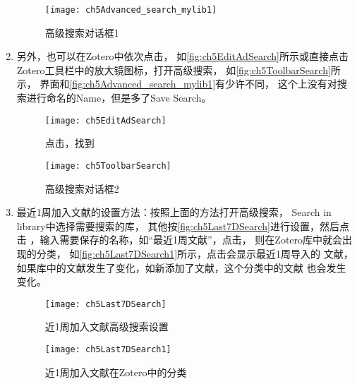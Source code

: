 \documentclass[cn,11pt,chinese]{elegantbook}
\begin{document}
\begin{enumerate}
						\begin{figure}[ht]
							\centering
							\texttt{[image: ch5Advanced\_search\_mylib1]}
							\caption{高级搜索对话框1}
							\label{fig:ch5Advanced_search_mylib1}
						\end{figure}
					\item 另外，也可以在Zotero中依次点击，
					如\autoref{fig:ch5EditAdSearch}所示或直接点击
					Zotero工具栏中的放大镜图标，打开高级搜索，
					如\autoref{fig:ch5ToolbarSearch}所示，
					界面和\autoref{fig:ch5Advanced_search_mylib1}有少许不同，
					这个上没有对搜索进行命名的Name，但是多了Save Search。
						\begin{figure}[ht]
							\centering
							\texttt{[image: ch5EditAdSearch]}
							\caption{点击，找到}
							\label{fig:ch5EditAdSearch}
						\end{figure}
						\begin{figure}[ht]
							\centering
							\texttt{[image: ch5ToolbarSearch]}
							\caption{高级搜索对话框2}
							\label{fig:ch5ToolbarSearch}
						\end{figure}
					\item 最近1周加入文献的设置方法：按照上面的方法打开高级搜索，
					Search in library中选择需要搜索的库，
					其他按\autoref{fig:ch5Last7DSearch}进行设置，然后点击
					，输入需要保存的名称，如“最近1周文献”，点击，
					则在Zotero库中就会出现的分类，
					如\autoref{fig:ch5Last7DSearch1}所示，点击会显示最近1周导入的
					文献，如果库中的文献发生了变化，如新添加了文献，这个分类中的文献
					也会发生变化。
						\begin{figure}[ht]
							\centering
							\texttt{[image: ch5Last7DSearch]}
							\caption{近1周加入文献高级搜索设置}
							\label{fig:ch5Last7DSearch}
						\end{figure}	

						\begin{figure}[ht]
							\centering
							\texttt{[image: ch5Last7DSearch1]}
							\caption{近1周加入文献在Zotero中的分类}
							\label{fig:ch5Last7DSearch1}
						\end{figure}	
																

\end{enumerate}
\end{document}
